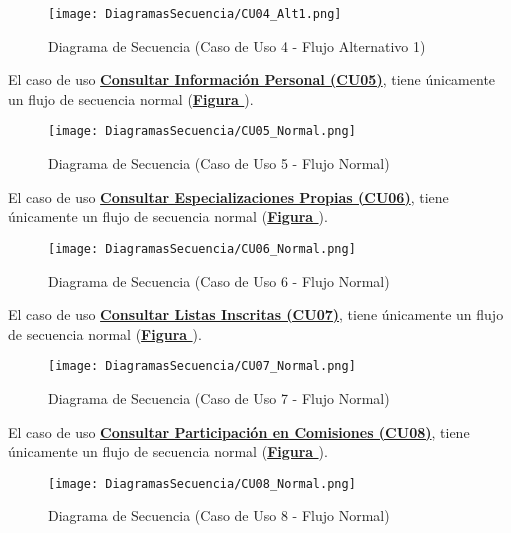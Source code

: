 \begin{figure}[!htbp]
  \centering
  \texttt{[image: DiagramasSecuencia/CU04\_Alt1.png]}
  \caption{Diagrama de Secuencia (Caso de Uso 4 - Flujo Alternativo 1)}
  \label{fig:Secuencia_CU4_Alt1}
\end{figure}
\FloatBarrier

\addtocounter{figura}{1}
El caso de uso \textbf{\hyperref[tab:cucConsultaInfoPersonal]{Consultar Información Personal (CU05)}}, tiene únicamente un flujo de secuencia normal (\textbf{\hyperref[fig:Secuencia_CU5_Normal]{Figura }}).
\begin{figure}[!htbp]
  \centering
  \texttt{[image: DiagramasSecuencia/CU05\_Normal.png]}
  \caption{Diagrama de Secuencia (Caso de Uso 5 - Flujo Normal)}
  \label{fig:Secuencia_CU5_Normal}
\end{figure}
\FloatBarrier

\addtocounter{figura}{1}
El caso de uso \textbf{\hyperref[tab:cucConsultaEspec]{Consultar Especializaciones Propias (CU06)}}, tiene únicamente un flujo de secuencia normal (\textbf{\hyperref[fig:Secuencia_CU6_Normal]{Figura }}).
\begin{figure}[!htbp]
  \centering
  \texttt{[image: DiagramasSecuencia/CU06\_Normal.png]}
  \caption{Diagrama de Secuencia (Caso de Uso 6 - Flujo Normal)}
  \label{fig:Secuencia_CU6_Normal}
\end{figure}
\FloatBarrier

\addtocounter{figura}{1}
El caso de uso \textbf{\hyperref[tab:cucConsultaLista]{Consultar Listas Inscritas (CU07)}}, tiene únicamente un flujo de secuencia normal (\textbf{\hyperref[fig:Secuencia_CU7_Normal]{Figura }}).
\begin{figure}[!htbp]
  \centering
  \texttt{[image: DiagramasSecuencia/CU07\_Normal.png]}
  \caption{Diagrama de Secuencia (Caso de Uso 7 - Flujo Normal)}
  \label{fig:Secuencia_CU7_Normal}
\end{figure}
\FloatBarrier

\addtocounter{figura}{1} \pagebreak
El caso de uso \textbf{\hyperref[tab:cucConsultaComision]{Consultar Participación en Comisiones (CU08)}}, tiene únicamente un flujo de secuencia normal (\textbf{\hyperref[fig:Secuencia_CU8_Normal]{Figura }}).
\begin{figure}[!htbp]
  \centering
  \texttt{[image: DiagramasSecuencia/CU08\_Normal.png]}
  \caption{Diagrama de Secuencia (Caso de Uso 8 - Flujo Normal)}
  \label{fig:Secuencia_CU8_Normal}
\end{figure}
\FloatBarrier

